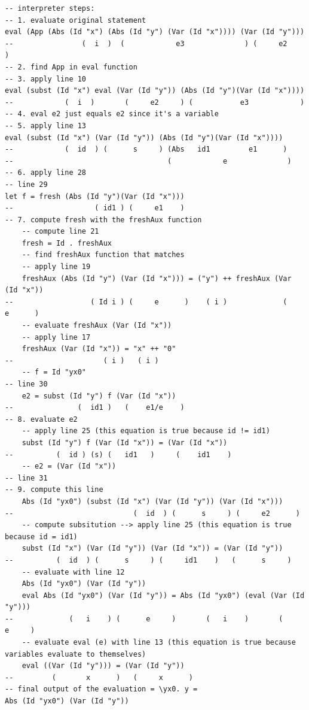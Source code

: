 \documentclass{article}
\theoremstyle{theorem}
\theoremstyle{definition}
\theoremstyle{remark}
\begin{document}
\begin{lstlisting}
-- interpreter steps:
-- 1. evaluate original statement
eval (App (Abs (Id "x") (Abs (Id "y") (Var (Id "x")))) (Var (Id "y"))) 
--                (  i  )  (            e3              ) (     e2     )
-- 2. find App in eval function 
-- 3. apply line 10 
eval (subst (Id "x") eval (Var (Id "y")) (Abs (Id "y")(Var (Id "x"))))
--            (  i  )       (     e2     ) (           e3            )
-- 4. eval e2 just equals e2 since it's a variable 
-- 5. apply line 13  
eval (subst (Id "x") (Var (Id "y")) (Abs (Id "y")(Var (Id "x"))))
--            (  id  ) (      s     ) (Abs   id1         e1      )
--                                    (            e              )
-- 6. apply line 28 
-- line 29 
let f = fresh (Abs (Id "y")(Var (Id "x"))) 
--                   ( id1 ) (     e1    )
-- 7. compute fresh with the freshAux function
    -- compute line 21 
    fresh = Id . freshAux 
    -- find freshAux function that matches 
    -- apply line 19 
    freshAux (Abs (Id "y") (Var (Id "x"))) = ("y") ++ freshAux (Var (Id "x"))
--                  ( Id i ) (     e      )    ( i )             (      e      )
    -- evaluate freshAux (Var (Id "x")) 
    -- apply line 17 
    freshAux (Var (Id "x")) = "x" ++ "0"
--                     ( i )   ( i )
    -- f = Id "yx0"
-- line 30
    e2 = subst (Id "y") f (Var (Id "x"))
--               (  id1 )   (    e1/e    ) 
-- 8. evaluate e2 
    -- apply line 25 (this equation is true because id != id1)
    subst (Id "y") f (Var (Id "x")) = (Var (Id "x")) 
--          (  id ) (s) (   id1   )     (    id1    ) 
    -- e2 = (Var (Id "x")) 
-- line 31 
-- 9. compute this line 
    Abs (Id "yx0") (subst (Id "x") (Var (Id "y")) (Var (Id "x")))
--                            (  id  ) (      s     ) (     e2      )
    -- compute subsitution --> apply line 25 (this equation is true because id = id1)
    subst (Id "x") (Var (Id "y")) (Var (Id "x")) = (Var (Id "y"))
--          (  id  ) (      s     ) (     id1    )   (      s     )
    -- evaluate with line 12 
    Abs (Id "yx0") (Var (Id "y")) 
    eval Abs (Id "yx0") (Var (Id "y")) = Abs (Id "yx0") (eval (Var (Id "y")))
--             (   i    ) (      e     )       (   i    )       (      e     ) 
    -- evaluate eval (e) with line 13 (this equation is true because variables evaluate to themselves)
    eval ((Var (Id "y"))) = (Var (Id "y"))
--         (       x      )   (     x      )
-- final output of the evaluation = \yx0. y = 
Abs (Id "yx0") (Var (Id "y")) 
\end{lstlisting}
\end{document}
